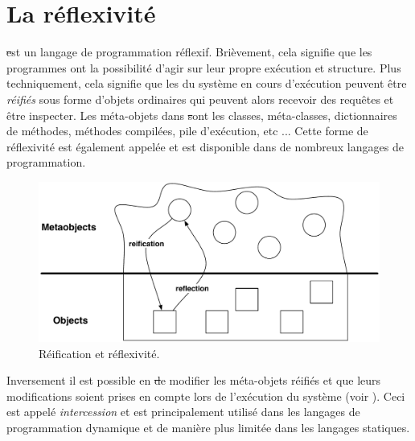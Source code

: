 \documentclass[a4paper,10pt,twoside]{book}
\begin{document}
	\sloppy
\fi

\chapter{La réflexivité}


\st est un langage de programmation réflexif. Brièvement, cela signifie que les programmes ont la possibilité d'agir sur leur propre exécution et structure.
Plus techniquement, cela signifie que les  du système en cours d'exécution peuvent être \emph{réifiés} sous forme d'objets ordinaires qui peuvent alors recevoir des requêtes et être inspecter.
Les méta-objets dans \st sont les classes, méta-classes, dictionnaires de méthodes, méthodes compilées, pile d'exécution, etc ...
Cette forme de réflexivité est également appelée  et est disponible dans de nombreux langages de programmation.

\begin{figure}[ht]\centering
	\includegraphics[width=\linewidth]{reflect}
	\caption{Réification et réflexivité.} %
\end{figure}
Inversement il est possible en \st de modifier les méta-objets réifiés et que leurs modifications soient prises en compte lors de l'exécution du système (voir ).
Ceci est appelé \emph{intercession} et est principalement utilisé dans les langages de programmation dynamique et de manière plus limitée dans les langages statiques.
\end{document}
